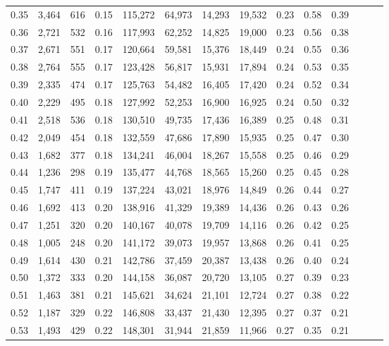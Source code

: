 \begin{tabular}{rrrrrrrrrrrrrr}
0.35 &  3,464 &  616 &  0.15 &  115,272 &   64,973 &  14,293 &  19,532 &  0.23 &  0.58 &      0.39 \\
0.36 &  2,721 &  532 &  0.16 &  117,993 &   62,252 &  14,825 &  19,000 &  0.23 &  0.56 &      0.38 \\
0.37 &  2,671 &  551 &  0.17 &  120,664 &   59,581 &  15,376 &  18,449 &  0.24 &  0.55 &      0.36 \\
0.38 &  2,764 &  555 &  0.17 &  123,428 &   56,817 &  15,931 &  17,894 &  0.24 &  0.53 &      0.35 \\
0.39 &  2,335 &  474 &  0.17 &  125,763 &   54,482 &  16,405 &  17,420 &  0.24 &  0.52 &      0.34 \\
0.40 &  2,229 &  495 &  0.18 &  127,992 &   52,253 &  16,900 &  16,925 &  0.24 &  0.50 &      0.32 \\
0.41 &  2,518 &  536 &  0.18 &  130,510 &   49,735 &  17,436 &  16,389 &  0.25 &  0.48 &      0.31 \\
0.42 &  2,049 &  454 &  0.18 &  132,559 &   47,686 &  17,890 &  15,935 &  0.25 &  0.47 &      0.30 \\
0.43 &  1,682 &  377 &  0.18 &  134,241 &   46,004 &  18,267 &  15,558 &  0.25 &  0.46 &      0.29 \\
0.44 &  1,236 &  298 &  0.19 &  135,477 &   44,768 &  18,565 &  15,260 &  0.25 &  0.45 &      0.28 \\
0.45 &  1,747 &  411 &  0.19 &  137,224 &   43,021 &  18,976 &  14,849 &  0.26 &  0.44 &      0.27 \\
0.46 &  1,692 &  413 &  0.20 &  138,916 &   41,329 &  19,389 &  14,436 &  0.26 &  0.43 &      0.26 \\
0.47 &  1,251 &  320 &  0.20 &  140,167 &   40,078 &  19,709 &  14,116 &  0.26 &  0.42 &      0.25 \\
0.48 &  1,005 &  248 &  0.20 &  141,172 &   39,073 &  19,957 &  13,868 &  0.26 &  0.41 &      0.25 \\
0.49 &  1,614 &  430 &  0.21 &  142,786 &   37,459 &  20,387 &  13,438 &  0.26 &  0.40 &      0.24 \\
0.50 &  1,372 &  333 &  0.20 &  144,158 &   36,087 &  20,720 &  13,105 &  0.27 &  0.39 &      0.23 \\
0.51 &  1,463 &  381 &  0.21 &  145,621 &   34,624 &  21,101 &  12,724 &  0.27 &  0.38 &      0.22 \\
0.52 &  1,187 &  329 &  0.22 &  146,808 &   33,437 &  21,430 &  12,395 &  0.27 &  0.37 &      0.21 \\
0.53 &  1,493 &  429 &  0.22 &  148,301 &   31,944 &  21,859 &  11,966 &  0.27 &  0.35 &      0.21 \\

\end{tabular}
